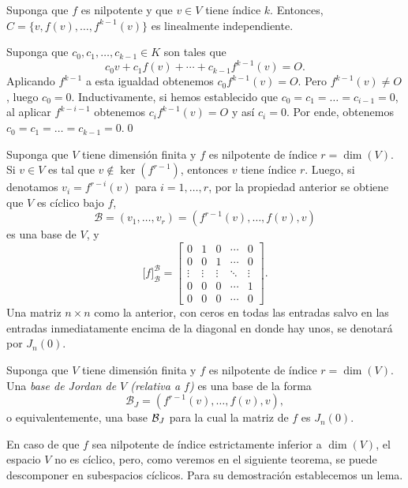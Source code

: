 \begin{prop}
  Suponga que $f$ es nilpotente y que $v\in V$ tiene índice $k$. Entonces, $C=\{v,f(v),\ldots,f^{k-1}(v)\}$ es linealmente independiente.
\end{prop}

\dem Suponga que $c_0,c_1,\ldots,c_{k-1}\in K$ son tales que
\[
c_0v+c_1f(v)+\cdots+c_{k-1}f^{{k-1}}(v)=O.
\]
Aplicando $f^{k-1}$ a esta igualdad obtenemos $c_0f^{k-1}(v)=O$. Pero $f^{k-1}(v)\ne O$, luego $c_0=0$. Inductivamente, si hemos establecido que $c_0=c_1=\ldots=c_{i-1}=0$, al aplicar $f^{k-i-1}$ obtenemos $c_if^{k-1}(v)=O$ y así $c_i=0$. Por ende, obtenemos $c_0=c_1=\ldots=c_{k-1}=0$.\qed

\begin{obs}\label{obsformajordannil}
Suponga que $V$ tiene dimensi\'on finita y $f$ es nilpotente de índice $r=\dim(V)$. Si $v\in V$ es tal que $v\not\in\ker(f^{r-1})$, entonces $v$ tiene índice $r$. Luego, si denotamos $v_i=f^{r-i}(v)$ para $i=1,\ldots,r$, por la propiedad anterior se obtiene que $V$ es cíclico bajo $f$,
\[
\mathcal{B}=(v_1,\ldots,v_r)=(f^{r-1}(v),\ldots,f(v),v)
\]
es una base de $V$, y
\[
\Big[f\Big]^{\mathcal{B}}_{\mathcal{B}}=\left[\begin{array}{ccccc}
0 & 1 & 0 &\cdots & 0\\
0 & 0 & 1 &\cdots & 0\\
\vdots & \vdots & \vdots &\ddots & \vdots\\
0 & 0 & 0 & \cdots & 1\\
0 & 0 & 0 & \cdots & 0
\end{array}\right].
\]
Una matriz $n\times n$ como la anterior, con ceros en todas las entradas salvo en las entradas inmediatamente encima de la diagonal en donde hay unos, se denotará por $J_n(0)$.
\end{obs}

\begin{defn}\label{base_de_jordan_0}
Suponga que $V$ tiene dimensi\'on finita y $f$ es nilpotente de índice $r=\dim(V)$. Una \emph{base de Jordan de $V$ (relativa a $f$)} es una base de la forma
\[
\mathcal{B}_J=(f^{r-1}(v),\ldots,f(v),v),
\]
o equivalentemente, una base $\mathcal{B}_J$ para la cual la matriz de $f$ es $J_n(0)$.
\end{defn}

\begin{obs}
En caso de que $f$ sea nilpotente de índice estrictamente inferior a $\dim(V)$, el espacio $V$ no es c\'iclico, pero, como veremos en el siguiente teorema, se puede descomponer en subespacios cíclicos. Para su demostración establecemos un lema.
\end{obs}

